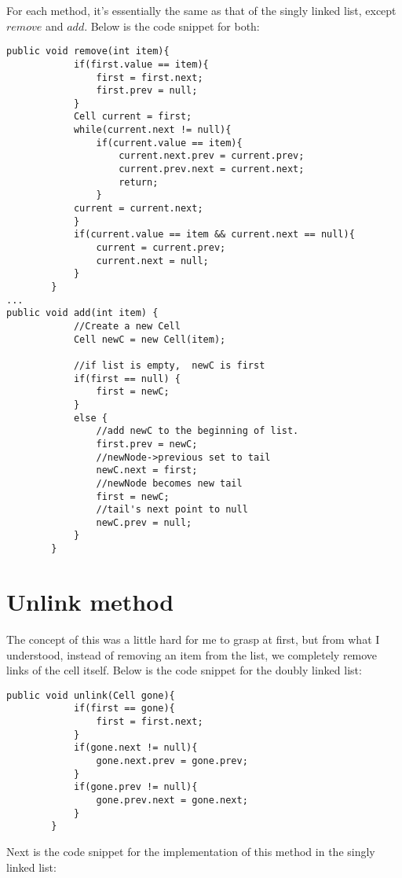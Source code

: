 \documentclass[a4paper,11pt]{article}
\begin{document}
For each method, it's essentially the same as that of the singly linked list, except $remove$ and $add$. Below is the code snippet for both:
\begin{verbatim}
public void remove(int item){
            if(first.value == item){
                first = first.next;
                first.prev = null;
            }
            Cell current = first;
            while(current.next != null){
                if(current.value == item){
                    current.next.prev = current.prev;
                    current.prev.next = current.next;
                    return;
                }
            current = current.next;
            }
            if(current.value == item && current.next == null){
                current = current.prev;
                current.next = null;
            }
        }
...
public void add(int item) {  
            //Create a new Cell  
            Cell newC = new Cell(item);  
       
            //if list is empty,  newC is first
            if(first == null) {  
                first = newC;  
            }  
            else {  
                //add newC to the beginning of list. 
                first.prev = newC;
                //newNode->previous set to tail  
                newC.next = first;  
                //newNode becomes new tail  
                first = newC;  
                //tail's next point to null  
                newC.prev = null;  
            }  
        }  
\end{verbatim}


\section*{Unlink method}

The concept of this was a little hard for me to grasp at first, but from what I understood, instead of removing an item from the list, we completely remove links of the cell itself. Below is the code snippet for the doubly linked list:
 
\begin{verbatim}
public void unlink(Cell gone){
            if(first == gone){
                first = first.next;
            }
            if(gone.next != null){
                gone.next.prev = gone.prev; 
            }
            if(gone.prev != null){
                gone.prev.next = gone.next;
            }
        }
\end{verbatim}

Next is the code snippet for the implementation of this method in the singly linked list:
\end{document}
